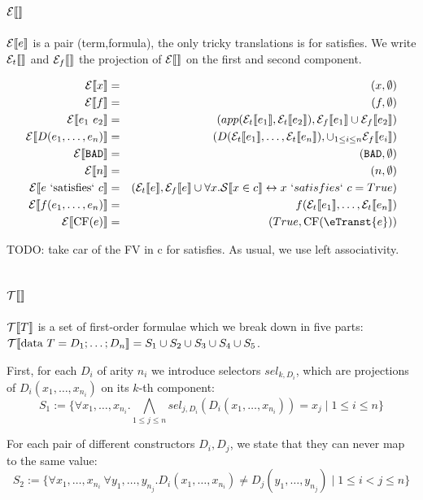 \documentclass{article}
\begin{document}
\subsection{$\mathcal{E} \llbracket  \rrbracket$}
$\mathcal{E} \llbracket e \rrbracket$ is a pair (term,formula), the only tricky translations is
for satisfies.  We write $\mathcal{E}_t \llbracket  \rrbracket$ and $\mathcal{E}_{f} \llbracket  \rrbracket$ the projection
of $\mathcal{E} \llbracket  \rrbracket$ on the first and second component.

\begin{eqnarray}
\etrans{x} &=& (x,\emptyset)\\
\etrans{f} &=& (f,\emptyset)\\
\etrans{e_1~e_2} &=& (app(\etranst{e_1},\etranst{e_2}),\etransf{e_1} \cup \etransf{e_2})\\
\etrans{D(e_1,\dots,e_n)} &=& (D(\etranst{e_1},\dots,\etranst{e_n}),\cup_{1 \leq i \leq n} \etransf{e_i})\\
\etrans{\bad} &=& (\bad,\emptyset)\\
\etrans{n} &=& (n,\emptyset)\\
\etrans{e \mbox{ `satisfies` } c} &=& (\etranst{e},\etransf{e} \cup \forall x. \strans{x \in c} \leftrightarrow x~`satisfies`~c = True)\\
\etrans{f(e_1,\dots,e_n)} &=& f(\etranst{e_1},\dots,\etranst{e_n})\\
\etrans{\cf{e}} &=& (True,\cf{\eTranst{e}})\\
\end{eqnarray}

TODO: take car of the FV in c for satisfies.
As usual, we use left associativity.

\subsection{$\mathcal{T} \llbracket  \rrbracket$}
$\mathcal{T} \llbracket T \rrbracket$ is a set of first-order formulae which we break down in five parts:
$\mathcal{T} \llbracket \mbox{data } T = D_1 ; \dots ; D_n \rrbracket = S_1 \cup S_2 \cup S_3 \cup S_4 \cup S_5$.

First, for each $D_i$ of arity $n_i$ we introduce selectors $sel_{k,D_i}$, which are projections of $D_i(x_1,\dots,x_n_i)$ on its $k$-th component:
$$S_1 := \{ \forall x_1,\dots,x_{n_i} . \bigwedge_{1 \leq j \leq n} sel_{j,D_i}(D_i(x_1,\dots,x_{n_i})) = x_j \mid 1 \leq i \leq n \}$$

For each pair of different constructors $D_i,D_j$, we state that they can never map to the same value: 
$$S_2 := \{ \forall x_1,\dots,x_{n_i}~\forall y_1,\dots,y_{n_j} . D_i(x_1,\dots,x_{n_i}) \neq D_j(y_1,\dots,y_{n_j}) \mid 1 \leq i < j \leq n \}$$
\end{document}
